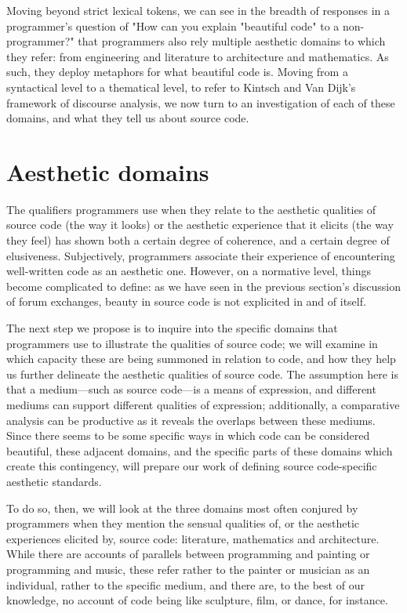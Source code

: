 Moving beyond strict lexical tokens, we can see in the breadth of responses in a programmer's question of "How can you explain "beautiful code" to a non-programmer?" \citep{stackoverflow_how_2013} that programmers also rely multiple aesthetic domains to which they refer: from engineering and literature to architecture and mathematics. As such, they deploy metaphors for what beautiful code is. Moving from a syntactical level to a thematical level, to refer to Kintsch and Van Dijk's framework of discourse analysis, we now turn to an investigation of each of these domains, and what they tell us about source code.

\section{Aesthetic domains}
\label{sec:aesthetic-domains}

The qualifiers programmers use when they relate to the aesthetic qualities of source code (the way it looks) or the aesthetic experience that it elicits (the way they feel) has shown both a certain degree of coherence, and a certain degree of elusiveness. Subjectively, programmers associate their experience of encountering well-written code as an aesthetic one. However, on a normative level, things become complicated to define: as we have seen in the previous section's discussion of forum exchanges, beauty in source code is not explicited in and of itself.

The next step we propose is to inquire into the specific domains that programmers use to illustrate the qualities of source code; we will examine in which capacity these are being summoned in relation to code, and how they help us further delineate the aesthetic qualities of source code. The assumption here is that a medium—such as source code—is a means of expression, and different mediums can support different qualities of expression; additionally, a comparative analysis can be productive as it reveals the overlaps between these mediums. Since there seems to be some specific ways in which code can be considered beautiful, these adjacent domains, and the specific parts of these domains which create this contingency, will prepare our work of defining source code-specific aesthetic standards.

To do so, then, we will look at the three domains most often conjured by programmers when they mention the sensual qualities of, or the aesthetic experiences elicited by, source code: literature, mathematics and architecture. While there are accounts of parallels between programming and painting \citep{graham_hackers_2003} or programming and music\citep{mclean_hacking_2004}, these refer rather to the painter or musician as an individual, rather to the specific medium, and there are, to the best of our knowledge, no account of code being like sculpture, film, or dance, for instance.

